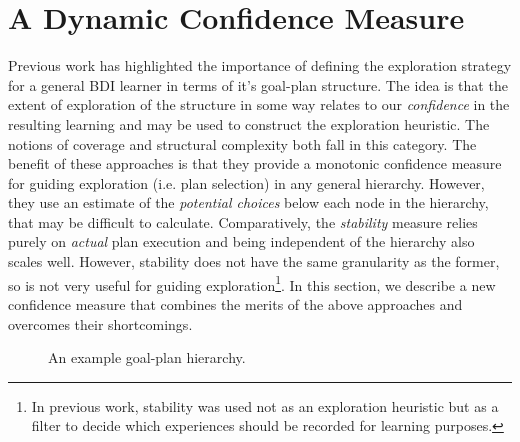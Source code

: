 \section{A Dynamic Confidence Measure}\label{sec:confidence}

Previous work has highlighted the importance of defining the exploration strategy for a general BDI learner in terms of it's goal-plan structure. The idea is that the extent of exploration of the structure in some way relates to our {\em confidence} in the resulting learning and may be used to construct the exploration heuristic. The notions of coverage \cite{singh10:learning} and structural complexity \cite{singh10:extending} both fall in this category. The benefit of these approaches is that they provide a monotonic confidence measure for guiding exploration (i.e. plan selection) in any general hierarchy. However, they use an estimate of the \textit{potential choices} below each node in the hierarchy, that may be difficult to calculate. Comparatively, the \textit{stability} \cite{airiau09:enhancing,singh10:learning} measure relies purely on {\em actual} plan execution and being independent of the hierarchy also scales well. However, stability does not have the same granularity as the former, so is not very useful for guiding exploration\footnote{In previous work\cite{singh10:extending}, stability was used not as an exploration heuristic but as a filter to decide which experiences should be recorded for learning purposes.}. In this section, we describe a new confidence measure that combines the merits of the above approaches and overcomes their shortcomings. 

\begin{figure}[ht]
\begin{center}

\end{center}
\caption{An example goal-plan hierarchy.}
\label{fig:confidence}
\end{figure}

